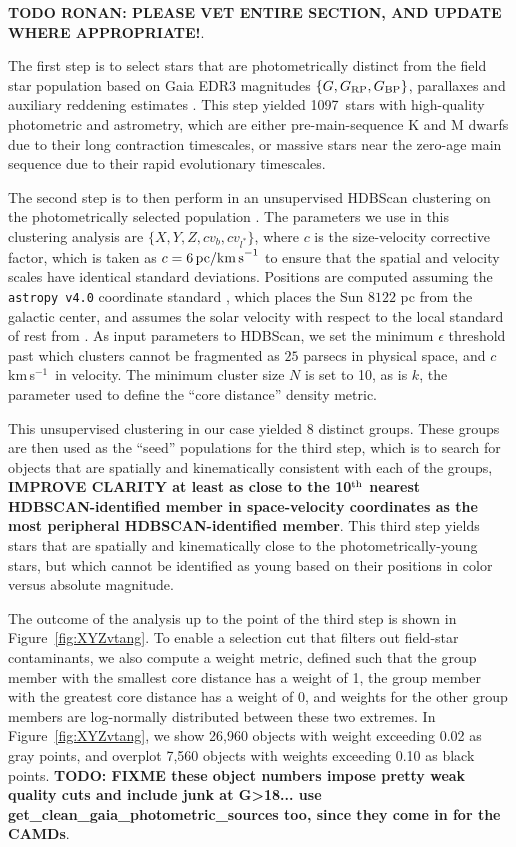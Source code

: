 \documentclass[12pt,twocolumn,linenumbers]{aastex63}
\newcommand{\npms}{1097} %
\newcommand{\kms}{\,km\,s$^{-1}$}
\begin{document}
{\bf TODO RONAN: PLEASE VET ENTIRE SECTION, AND UPDATE WHERE
APPROPRIATE!}.

The first step is to select stars that are photometrically distinct
from the field star population based on Gaia EDR3 magnitudes $\{G,
G_{\rm RP}, G_{\rm BP}\}$, parallaxes and auxiliary reddening
estimates \citep{lallement_gaia-2mass_2019}.  This step yielded \npms\
stars with high-quality photometric and astrometry, which are either
pre-main-sequence K and M dwarfs due to their long contraction
timescales, or massive stars near the zero-age main sequence due to
their rapid evolutionary timescales.

The second step is to then perform in an unsupervised HDBScan
clustering on the photometrically selected population
\citep{campello_hierarchical_2015,mcinnes_hdbscan_2017}.  The
parameters we use in this clustering analysis are $\{ X, Y, Z, c v_b,
c v_{l^*} \} $, where $c$ is the size-velocity corrective factor,
which is taken as $c=6\,{\rm pc / km\,s}^{-1}$ to ensure that the
spatial and velocity scales have identical standard deviations.
Positions are computed assuming the \texttt{astropy v4.0} coordinate
standard \citep{astropy_2018}, which places the Sun $8122$ pc from the
galactic center, and assumes the solar velocity with respect to the
local standard of rest from \citet{schonrich_local_2010}.  As input
parameters to HDBScan, we set the minimum $\epsilon$ threshold past
which clusters cannot be fragmented as $25$ parsecs in physical space,
and $c$ \kms\ in velocity.  The minimum cluster size $N$ is set to 10,
as is $k$, the parameter used to define the ``core distance'' density
metric. 

This unsupervised clustering in our case yielded 8 distinct groups.
These groups are then used as the ``seed'' populations for the third
step, which is to search for objects that are spatially and
kinematically consistent with each of the groups, {\bf IMPROVE
CLARITY at least as close to the 10$^{\rm th}$ nearest
HDBSCAN-identified member in space-velocity coordinates as the most
peripheral HDBSCAN-identified member}.  This third step yields stars
that are spatially and kinematically close to the
photometrically-young stars, but which cannot be identified as young
based on their positions in color versus absolute magnitude.

The outcome of the analysis up to the point of the third step is
shown in Figure~\ref{fig:XYZvtang}.  To enable a selection cut that
filters out field-star contaminants, we also compute a weight metric,
defined such that the group member with the smallest core distance has
a weight of 1, the group member with the greatest core distance has a
weight of 0, and weights for the other group members are log-normally
distributed between these two extremes.  In Figure~\ref{fig:XYZvtang}, we
show 26{,}960 objects with weight exceeding 0.02 as gray points, and
overplot 7{,}560 objects with weights exceeding 0.10 as black points.
{\bf TODO: FIXME these object numbers impose pretty weak quality cuts and include junk at G>18... 
use get\_clean\_gaia\_photometric\_sources too, since they come in for
the CAMDs}.
\end{document}
